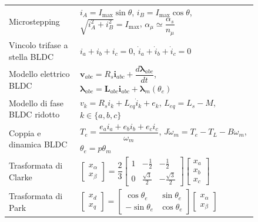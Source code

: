 \documentclass[11pt,a4paper]{article}
\begin{document}
{\begin{longtable}{>{\raggedright\arraybackslash}p{0.24\linewidth}>{\raggedright\arraybackslash}p{0.60\linewidth}}
Microstepping & $i_A=I_{\max}\sin\theta$, \quad $i_B=I_{\max}\cos\theta$, \quad $\sqrt{i_A^2+i_B^2}=I_{\max}$, \quad $\alpha_\mu\simeq\dfrac{\alpha_s}{n_\mu}$ \\
Vincolo trifase a stella BLDC & $i_a+i_b+i_c=0$, \quad $\dot i_a+\dot i_b+\dot i_c=0$ \\
Modello elettrico BLDC & $\mathbf v_{abc}=R_s\mathbf i_{abc}+\dfrac{d\boldsymbol\lambda_{abc}}{dt}$, \quad $\boldsymbol\lambda_{abc}=\mathbf L_{abc}\mathbf i_{abc}+\boldsymbol\lambda_m(\theta_e)$ \\
Modello di fase BLDC ridotto & $v_k=R_s i_k+L_{eq}\dot i_k+e_k$, \quad $L_{eq}=L_s-M$, \quad $k\in\{a,b,c\}$ \\
Coppia e dinamica BLDC & $T_e=\dfrac{e_ai_a+e_bi_b+e_ci_c}{\omega_m}$, \quad $J\dot\omega_m=T_e-T_L-B\omega_m$, \quad $\theta_e=p\theta_m$ \\
Trasformata di Clarke & $\begin{bmatrix}x_\alpha\\x_\beta\end{bmatrix}=\dfrac{2}{3}\begin{bmatrix}1&-\frac12&-\frac12\\0&\frac{\sqrt3}{2}&-\frac{\sqrt3}{2}\end{bmatrix}\begin{bmatrix}x_a\\x_b\\x_c\end{bmatrix}$ \\
Trasformata di Park & $\begin{bmatrix}x_d\\x_q\end{bmatrix}=\begin{bmatrix}\cos\theta_e&\sin\theta_e\\-\sin\theta_e&\cos\theta_e\end{bmatrix}\begin{bmatrix}x_\alpha\\x_\beta\end{bmatrix}$ \\

\end{longtable}}
\end{document}
